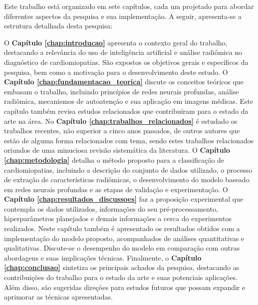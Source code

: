 Este trabalho está organizado em sete capítulos, cada um projetado para abordar diferentes aspectos da pesquisa e sua implementação. A seguir, apresenta-se a estrutura detalhada desta pesquisa:

O \textbf{Capítulo \ref{chap:introducao}} apresenta o contexto geral do trabalho, destacando a relevância do uso de inteligência artificial e análise radiômica no diagnóstico de cardiomiopatias. São expostos os objetivos gerais e específicos da pesquisa, bem como a motivação para o desenvolvimento deste estudo. O \textbf{Capítulo \ref{chap:fundamentacao_teorica}} discute os conceitos teóricos que embasam o trabalho, incluindo princípios de redes neurais profundas, análise radiômica, mecanismos de autoatenção e sua aplicação em imagens médicas. Este capítulo também revisa estudos relacionados que contribuíram para o estado da arte na área. No \textbf{Capítulo \ref{chap:trabalhos_relacionados}} é estudado  os trabalhos recentes, não superior a cinco anos passados, de outros autores que estão de alguma forma relacionados com tema, sendo estes trabalhos relacionados oriundos de uma minuciosa revisão sistemática da literatura. O \textbf{Capítulo \ref{chap:metodologia}} detalha o método proposto para a classificação de cardiomiopatias, incluindo a descrição do conjunto de dados utilizado, o processo de extração de características radiômicas, o desenvolvimento do modelo baseado em redes neurais profundas e as etapas de validação e experimentação. O \textbf{Capítulo \ref{chap:resultados_discussoes}} faz a proposição experimental que contempla os dados utilizados, informações do seu pré-processamento, hiperparâmetros planejados e demais informações a cerca do experimentos realizados. Neste capítulo também é apresentado os resultados obtidos com a implementação do modelo proposto, acompanhados de análises quantitativas e qualitativas. Discute-se o desempenho do modelo em comparação com outras abordagens e suas implicações técnicas. Finalmente, o \textbf{Capítulo \ref{chap:conclusao}} sintetiza os principais achados da pesquisa, destacando as contribuições do trabalho para o estado da arte e suas potenciais aplicações. Além disso, são sugeridas direções para estudos futuros que possam expandir e aprimorar as técnicas apresentadas.
